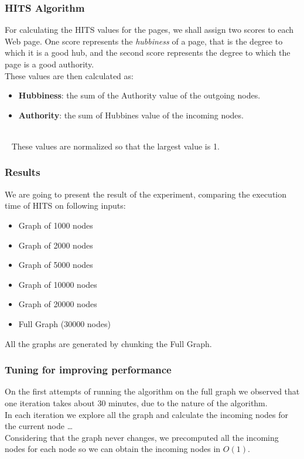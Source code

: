 \documentclass{beamer}
\begin{document}
\begin{frame}
\frametitle{HITS Algorithm}
For calculating the HITS values for the pages, we shall assign two scores to each Web page.
One score represents the \textit{hubbiness} of a page, that is the degree to which it
is a good hub, and the second score represents the degree to which the page
is a good authority.\\
\medskip
These values  are then calculated as:
\begin{itemize}
\item {} \textbf{Hubbiness}: the sum of the Authority value of the outgoing nodes.
\item {} \textbf{Authority}: the sum of Hubbines value of the incoming nodes.
\end{itemize}
\-\\\
\smallskip
\onslide<3-> These values are normalized so that the largest value is 1.
\end{frame}

\begin{frame}
\frametitle{Results}
We are going to present the result of the experiment, comparing the \alert{execution time} of HITS on following inputs:
\begin{itemize}
\item Graph of 1000 nodes
\item Graph of 2000 nodes
\item Graph of 5000 nodes
\item Graph of 10000 nodes
\item Graph of 20000 nodes
\item Full Graph (30000 nodes) 
\end{itemize}
All the graphs are generated by chunking the Full Graph.
\end{frame}

\begin{frame}
\frametitle{Tuning for improving performance}
On the first attempts of running the algorithm on the full graph we observed that one iteration takes about 30 minutes, due to the nature of the algorithm. \\
In each iteration we explore all the graph and calculate the incoming nodes for the current node \dots\\
\bigskip
Considering that the graph never changes, we precomputed all the incoming nodes for each node so we can obtain the incoming nodes in $O(1)$.
\end{frame}
\end{document}
